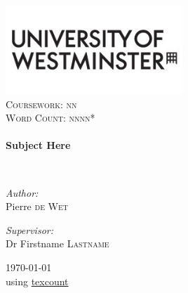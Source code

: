 \begin{titlepage}
\begin{center}

\includegraphics[width=0.5\textwidth]{logo_new}~\\[1cm]


\textsc{\Large Coursework: nn}\\[0.5cm]
\textsc{\Large Word Count: nnnn*}\\[0.5cm]

\HRule \\[0.4cm]
{ \huge \bfseries Subject Here \\[0.4cm] }

\HRule \\[1.5cm]

\noindent
\begin{minipage}{0.4\textwidth}
\begin{flushleft} \large
\emph{Author:}\\
Pierre \textsc{de Wet}
\end{flushleft}
\end{minipage}%
\begin{minipage}{0.4\textwidth}
\begin{flushright} \large
\emph{Supervisor:} \\
Dr Firstname \textsc{Lastname}

\end{flushright}
\end{minipage}

\vfill

{\large \today}\\
{\small *using {\href{http://app.uio.no/ifi/texcount/}{texcount}}}

\end{center}
\end{titlepage}